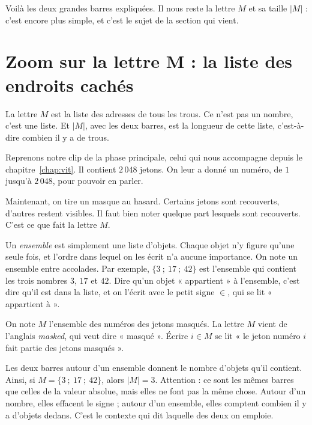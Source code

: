 Voilà les deux grandes barres expliquées. Il nous reste la lettre $M$ et sa
taille $|M|$ : c'est encore plus simple, et c'est le sujet de la section qui
vient.

\section{Zoom sur la lettre M : la liste des endroits cachés}

\begin{enclair}
La lettre $M$ est la liste des adresses de tous les trous. Ce n'est pas un
nombre, c'est une liste. Et $|M|$, avec les deux barres, est la longueur de
cette liste, c'est-à-dire combien il y a de trous.
\end{enclair}

Reprenons notre clip de la phase principale, celui qui nous accompagne
depuis le chapitre~\ref{chap:vit}. Il contient $2\,048$ jetons. On leur a
donné un numéro, de $1$ jusqu'à $2\,048$, pour pouvoir en parler.

Maintenant, on tire un masque au hasard. Certains jetons sont recouverts,
d'autres restent visibles. Il faut bien noter quelque part lesquels sont
recouverts. C'est ce que fait la lettre $M$.

\begin{definition}[Un ensemble][ensemble]
Un \emph{ensemble} est simplement une liste d'objets. Chaque objet n'y
figure qu'une seule fois, et l'ordre dans lequel on les écrit n'a aucune
importance. On note un ensemble entre accolades. Par exemple,
$\{3 \ ; \ 17 \ ; \ 42\}$ est l'ensemble qui contient les trois nombres $3$,
$17$ et $42$. Dire qu'un objet « appartient » à l'ensemble, c'est dire qu'il
est dans la liste, et on l'écrit avec le petit signe $\in$, qui se lit
« appartient à ».
\end{definition}

\begin{definition}
On note $M$ l'ensemble des numéros des jetons masqués. La lettre $M$ vient
de l'anglais \emph{masked}, qui veut dire « masqué ». Écrire $i \in M$ se lit
« le jeton numéro $i$ fait partie des jetons masqués ».
\end{definition}

\begin{definition}
Les deux barres autour d'un ensemble donnent le nombre d'objets qu'il
contient. Ainsi, si $M = \{3 \ ; \ 17 \ ; \ 42\}$, alors $|M| = 3$.
Attention : ce sont les mêmes barres que celles de la valeur absolue, mais
elles ne font pas la même chose. Autour d'un nombre, elles effacent le
signe ; autour d'un ensemble, elles comptent combien il y a d'objets dedans.
C'est le contexte
qui dit laquelle des deux on emploie.
\end{definition}

